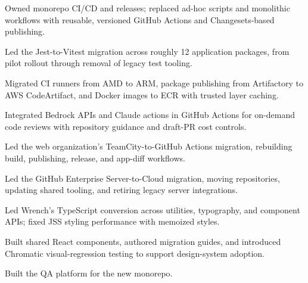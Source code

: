\begin{bullets}
  \item Owned monorepo CI/CD and releases; replaced ad-hoc scripts and monolithic workflows with reusable, versioned GitHub Actions and Changesets-based publishing.
  \item Led the Jest-to-Vitest migration across roughly 12 application packages, from pilot rollout through removal of legacy test tooling.
  \item Migrated CI runners from AMD to ARM, package publishing from Artifactory to AWS CodeArtifact, and Docker images to ECR with trusted layer caching.
  \item Integrated Bedrock APIs and Claude actions in GitHub Actions for on-demand code reviews with repository guidance and draft-PR cost controls.
\end{bullets}

\begin{bullets}
  \item Led the web organization's TeamCity-to-GitHub Actions migration, rebuilding build, publishing, release, and app-diff workflows.
  \item Led the GitHub Enterprise Server-to-Cloud migration, moving repositories, updating shared tooling, and retiring legacy server integrations.
\end{bullets}

\begin{bullets}
  \item Led Wrench's TypeScript conversion across utilities, typography, and component APIs; fixed JSS styling performance with memoized styles.
  \item Built shared React components, authored migration guides, and introduced Chromatic visual-regression testing to support design-system adoption.
\end{bullets}

\begin{bullets}
  \item Built the QA platform for the new monorepo.
\end{bullets}
